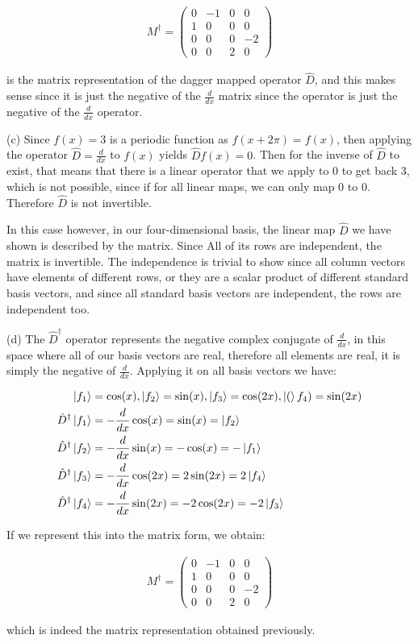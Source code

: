 \documentclass{article}
\begin{document}
\begin{align*}
{M}^{\dagger} = \begin{pmatrix}
0 & -1 & 0 & 0 \\ 1 & 0 & 0 & 0 \\ 0 & 0 & 0 & -2 \\ 0 & 0 & 2 & 0
\end{pmatrix}
\end{align*}

is the matrix representation of the dagger mapped operator $\hat{D}$, and this makes sense since it is just the negative of the $\frac{d}{dx}$ matrix since the operator is just the negative of the $\frac{d}{dx}$ operator.

(c) Since $f(x) = 3$ is a periodic function as $f(x+2\pi) = f(x)$, then applying the operator $\hat{D} = \frac{d}{dx}$ to $f(x)$ yields $\hat{D}f(x) = 0$. Then for the inverse of $\hat{D}$ to exist, that means that there is a linear operator that we apply to $0$ to get back $3$, which is not possible, since if for all linear maps, we can only map 0 to 0. Therefore $\hat{D}$ is not invertible.

In this case however, in our four-dimensional basis, the linear map $\hat{D}$ we have shown is described by the matrix. Since All of its rows are independent, the matrix is invertible. The independence is trivial to show since all column vectors have elements of different rows, or they are a scalar product of different standard basis vectors, and since all standard basis vectors are independent, the rows are independent too.

(d) The ${\hat{D}}^{\dagger}$ operator represents the negative complex conjugate of $\frac{d}{dx}$, in this space where all of our basis vectors are real, therefore all elements are real, it is simply the negative of $\frac{d}{dx}$. Applying it on all basis vectors we have:

\begin{align*}
\ket{f_1} &= \cos(x), \ket{f_2} = \sin(x), \ket{f_3} = \cos(2x), \ket(f_4) = \sin(2x) \\
{\hat{D}}^{\dagger} \ket{f_1} &= - \frac{d}{dx} \cos(x) = \sin(x) = \ket{f_2} \\
{\hat{D}}^{\dagger} \ket{f_2} &= - \frac{d}{dx} \sin(x) = -\cos(x) = - \ket{f_1} \\
{\hat{D}}^{\dagger} \ket{f_3} &= - \frac{d}{dx} \cos(2x) = 2\sin(2x) = 2\ket{f_4} \\
{\hat{D}}^{\dagger} \ket{f_4} &= - \frac{d}{dx} \sin(2x) = -2\cos(2x) = - 2\ket{f_3} \\
\end{align*}

If we represent this into the matrix form, we obtain: 

\begin{align*}
{M}^{\dagger} = \begin{pmatrix}
0 & -1 & 0 & 0 \\ 1 & 0 & 0 & 0 \\ 0 & 0 & 0 & -2 \\ 0 & 0 & 2 & 0
\end{pmatrix}
\end{align*}

which is indeed the matrix representation obtained previously.
\end{document}

